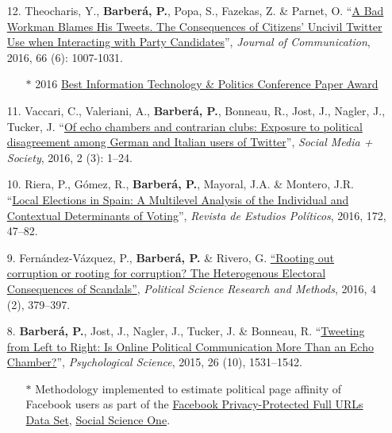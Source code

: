 \documentclass[margin,line,11pt]{resume}
\begin{document}
\begin{resume}
\begin{itemize}[leftmargin=5.5mm]
    
\item[12.] Theocharis, Y., \textbf{Barber\'{a}, P.}, Popa, S., Fazekas, Z. \& Parnet, O. ``\href{http://onlinelibrary.wiley.com/doi/10.1111/jcom.12259/abstract}{A Bad Workman Blames His Tweets. The Consequences of Citizens' Uncivil Twitter Use when Interacting with Party Candidates}'', \textit{Journal of Communication}, 2016, 66 (6): 1007-1031.
\begin{itemize}
\item[] $\ast$ 2016 \href{http://www.apsanet.org/section-18-best-conference-paper-award}{Best Information Technology \& Politics Conference Paper Award}
\end{itemize}

    
\item[11.] Vaccari, C., Valeriani, A., \textbf{Barber\'{a}, P.}, Bonneau, R., Jost, J., Nagler, J., Tucker, J. ``\href{http://sms.sagepub.com/content/2/3/2056305116664221.abstract}{Of echo chambers and contrarian clubs: Exposure to political disagreement among German and Italian users of Twitter}'', \textit{Social Media + Society}, 2016, 2 (3): 1--24.

\item[10.] Riera, P., G\'{o}mez, R., \textbf{Barber\'{a}, P.}, Mayoral, J.A. \& Montero, J.R. ``\href{http://www.cepc.gob.es/publicaciones/revistas/revistaselectronicas?IDR=3&IDN=1360&IDA=37721}{Local Elections in Spain: A Multilevel Analysis of the Individual and Contextual Determinants of Voting}'', \textit{Revista de Estudios Pol\'{i}ticos}, 2016, 172, 47--82.

\item[9.] Fern\'{a}ndez-V\'{a}zquez, P., \textbf{Barber\'{a}, P.} \& Rivero, G. \href{http://dx.doi.org/10.1017/psrm.2015.8}{``Rooting out corruption or rooting for corruption? The Heterogenous Electoral Consequences of Scandals''}, \textit{Political Science Research and Methods}, 2016, 4 (2), 379--397.

\item[8.] \textbf{Barber\'{a}, P.}, Jost, J., Nagler, J., Tucker, J. \& Bonneau, R. ``\href{http://pss.sagepub.com/content/early/2015/08/21/0956797615594620}{Tweeting from Left to Right: Is Online Political Communication More Than an Echo Chamber?}'', \textit{Psychological Science}, 2015, 26 (10), 1531--1542.
\begin{itemize}
\item[] $\ast$ Methodology implemented to estimate political page affinity of Facebook users as part of the \href{https://socialscience.one/files/partnershipone/files/urls-v2_1.pdf}{Facebook Privacy-Protected Full URLs Data Set}, \href{https://socialscience.one/}{Social Science One}.
\end{itemize}


\end{itemize}
\end{resume}
\end{document}

